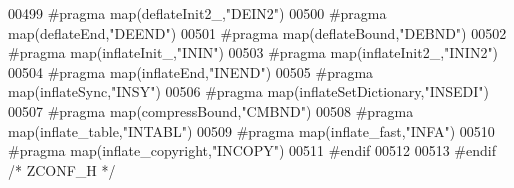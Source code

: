 \begin{DoxyCode}
00499 \textcolor{preprocessor}{  #pragma map(deflateInit2\_,"DEIN2")}
00500 \textcolor{preprocessor}{  #pragma map(deflateEnd,"DEEND")}
00501 \textcolor{preprocessor}{  #pragma map(deflateBound,"DEBND")}
00502 \textcolor{preprocessor}{  #pragma map(inflateInit\_,"ININ")}
00503 \textcolor{preprocessor}{  #pragma map(inflateInit2\_,"ININ2")}
00504 \textcolor{preprocessor}{  #pragma map(inflateEnd,"INEND")}
00505 \textcolor{preprocessor}{  #pragma map(inflateSync,"INSY")}
00506 \textcolor{preprocessor}{  #pragma map(inflateSetDictionary,"INSEDI")}
00507 \textcolor{preprocessor}{  #pragma map(compressBound,"CMBND")}
00508 \textcolor{preprocessor}{  #pragma map(inflate\_table,"INTABL")}
00509 \textcolor{preprocessor}{  #pragma map(inflate\_fast,"INFA")}
00510 \textcolor{preprocessor}{  #pragma map(inflate\_copyright,"INCOPY")}
00511 \textcolor{preprocessor}{#endif}
00512 
00513 \textcolor{preprocessor}{#endif }\textcolor{comment}{/* ZCONF\_H */}\textcolor{preprocessor}{}
\end{DoxyCode}
